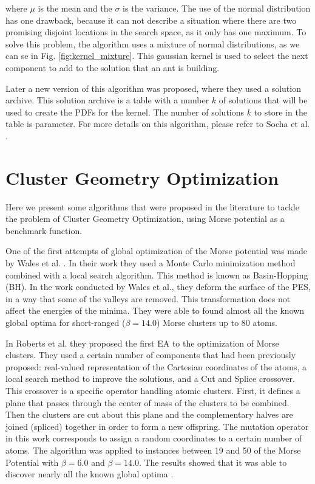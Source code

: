 					\noindent where $\mu$ is the mean and the $\sigma$ is the variance. The use of the normal distribution has one drawback, because it can not describe a situation where there are two promising disjoint locations in the search space, as it only has one maximum. To solve this problem, the algorithm uses a mixture of normal distributions, as we can se in Fig. \ref{fig:kernel_mixture}. This gaussian kernel is used to select the next component to add to the solution that an ant is building.

					 Later a new version of this algorithm was proposed, where they used a solution archive. This solution archive is a table with a number $k$ of solutions that will be used to create the PDFs for the kernel. The number of solutions $k$ to store in the table is parameter. For more details on this algorithm, please refer to Socha et al. \cite{socha08}.
					
	\pagebreak
			
	\section{Cluster Geometry Optimization}
		\label{subsec:cgo}
		Here we present some algorithms that were proposed in the literature to tackle the problem of Cluster Geometry Optimization, using Morse potential as a benchmark function.

		One of the first attempts of global optimization of the Morse potential was made by Wales et al. \cite{doye97, wales97}. In their work they used a Monte Carlo minimization method \cite{li87} combined with a local search algorithm. This method is known as Basin-Hopping (BH). In the work conducted by Wales et al., they deform the surface of the PES, in a way that some of the valleys are removed. This transformation does not affect the energies of the minima. They were able to found almost all the known global optima for short-ranged ($\beta = 14.0$) Morse clusters up to 80 atoms.
		
		In Roberts et al. \cite{roberts00} they proposed the first EA to the optimization of Morse clusters. They used a certain number of components that had been previously proposed: real-valued representation of the Cartesian coordinates of the atoms, a local search method to improve the solutions, and a Cut and Splice \cite{deaven95} crossover. This crossover is a specific operator handling atomic clusters. First, it defines a plane that passes through the center of mass of the clusters to be combined. Then the clusters are cut about this plane and the complementary halves are joined (spliced) together in order to form a new offspring.
		The mutation operator in this work corresponds to assign a random coordinates to a certain number of atoms. 
		The algorithm was applied to instances between 19 and 50 of the Morse Potential with $\beta = 6.0$ and $\beta = 14.0$. The results showed that it was able to discover nearly all the known global optima \cite{roberts00}.   
		
